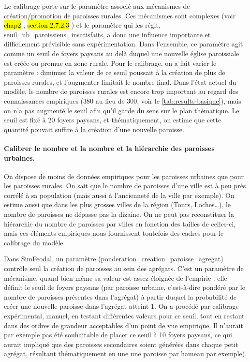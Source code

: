 Le calibrage porte sur le paramètre associé aux mécanismes de création/promotion de paroisses rurales.
Ces mécanismes sont complexes (voir \hl{chap2}%
, \hl{section 2.7.2.3}%
) et le paramètre qui les régit, \textsf{seuil\_nb\_paroissiens\_insatisfaits}, a donc une influence importante et difficilement prévisible sans expérimentation.
Dans l'ensemble, ce paramètre agit comme un seuil de foyers paysans au delà duquel une nouvelle église paroissiale est créée ou promue en zone rurale.
Pour le calibrage, on a fait varier le paramètre  : diminuer la valeur de ce seuil poussait à la création de plus de paroisses rurales, et l'augmenter limitait le nombre final.
Dans l'état actuel du modèle, le nombre de paroisses rurales est encore trop important au regard des connaissances empiriques (380 au lieu de 300, voir le \vref{tab:results-basique}), mais on n'a pas augmenté le seuil afin qu'il garde du sens sur le plan thématique.
Le seuil est fixé à 20 foyers paysans, et thématiquement, on estime que cette quantité pouvait suffire à la création d'une nouvelle paroisse.

\paragraph{Calibrer le nombre et la nombre et la hiérarchie des paroisses \og urbaines\fg{}.}

On dispose de moins de données empiriques pour les paroisses urbaines que pour les paroisses rurales.
On sait que le nombre de paroisses d'une ville est à peu près corrélé à sa population (mais aussi à l'ancienneté de la ville par exemple).
On estime aussi que dans les plus grosses villes de la région (Tours, Loches\ldots), le nombre de paroisses ne dépasse pas la dizaine.
On ne peut pas reconstituer la hiérarchie du nombre de paroisses par villes en fonction des tailles de celles-ci, mais ces éléments empiriques nous fournissent toutefois des cadres pour le calibrage du modèle.

Dans SimFeodal, un paramètre (\textsf{ponderation\_creation\_paroisse\_agregat}) contrôle seul la création de paroisses au sein des agrégats.
C'est un \og paramètre de mécanisme\fg{}, quand bien même sa valeur est assez éloignée de l'empirie : elle définit le seuil de foyers paysans (par paroisse urbaine, c'est-à-dire pondéré par le nombre de paroisses présentes dans l'agrégat) à partir duquel la probabilité de créer une nouvelle paroisse dans l'agrégat atteint 1.
On a procédé par calibrage expérimental, manuel, en testant différentes valeurs pour ce seuil, tout en restant dans des ordres de grandeur acceptables d'un point de vue empirique.
Il n'aurait par exemple pas été souhaitable de placer ce seuil à 10 foyers paysans, ce qui aurait impliqué que des paroisses secondaires soient générées dans chaque petit agrégat, résultant thématiquement en une une paroisse par hameau par exemple).

